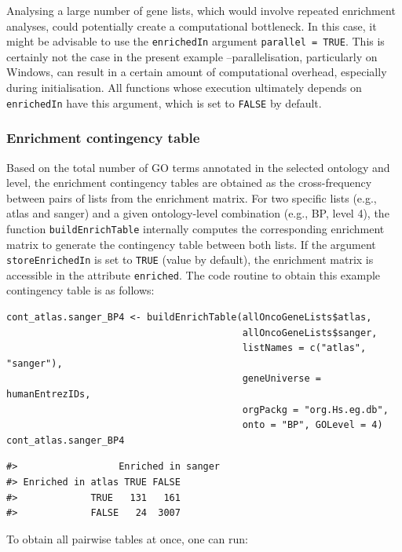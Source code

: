Analysing a large number of gene lists, which would involve repeated enrichment analyses, could potentially create a computational bottleneck. In this case, it might be advisable to use the \texttt{enrichedIn} argument \texttt{parallel\ =\ TRUE}. This is certainly not the case in the present example --parallelisation, particularly on Windows, can result in a certain amount of computational overhead, especially during initialisation. All functions whose execution ultimately depends on \texttt{enrichedIn} have this argument, which is set to \texttt{FALSE} by default.

\hypertarget{enrichment-contingency-table}{%
\subsubsection{Enrichment contingency table}\label{enrichment-contingency-table}}

Based on the total number of GO terms annotated in the selected ontology and level, the enrichment contingency tables are obtained as the cross-frequency between pairs of lists from the enrichment matrix. For two specific lists (e.g., atlas and sanger) and a given ontology-level combination (e.g., BP, level 4), the function \texttt{buildEnrichTable} internally computes the corresponding enrichment matrix to generate the contingency table between both lists. If the argument \texttt{storeEnrichedIn} is set to \texttt{TRUE} (value by default), the enrichment matrix is accessible in the attribute \texttt{enriched}. The code routine to obtain this example contingency table is as follows:

\begin{verbatim}
cont_atlas.sanger_BP4 <- buildEnrichTable(allOncoGeneLists$atlas, 
                                          allOncoGeneLists$sanger,
                                          listNames = c("atlas", "sanger"),
                                          geneUniverse = humanEntrezIDs, 
                                          orgPackg = "org.Hs.eg.db", 
                                          onto = "BP", GOLevel = 4)
cont_atlas.sanger_BP4
\end{verbatim}

\begin{verbatim}
#>                  Enriched in sanger
#> Enriched in atlas TRUE FALSE
#>             TRUE   131   161
#>             FALSE   24  3007
\end{verbatim}

To obtain all pairwise tables at once, one can run:


